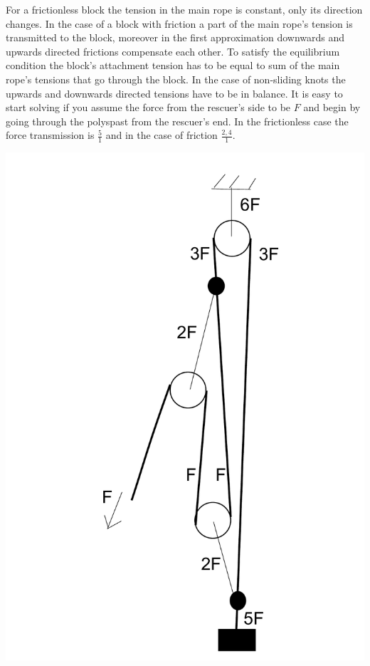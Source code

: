{\ifEngSolution
For a frictionless block the tension in the main rope is constant, only its direction changes. In the case of a block with friction a part of the main rope’s tension is transmitted to the block, moreover in the first approximation downwards and upwards directed frictions compensate each other. To satisfy the equilibrium condition the block’s attachment tension has to be equal to sum of the main rope’s tensions that go through the block. In the case of non-sliding knots the upwards and downwards directed tensions have to be in balance. It is easy to start solving if you assume the force from the rescuer’s side to be $F$ and begin by going through the polyspast from the rescuer’s end. In the frictionless case the force transmission is $\frac{5}{1}$ and in the case of friction $\frac{2,4}{1}$. 
\begin{center}
\includegraphics[scale=0.25]{2014-v3g-06-PolyspastL1}

\end{center}}
